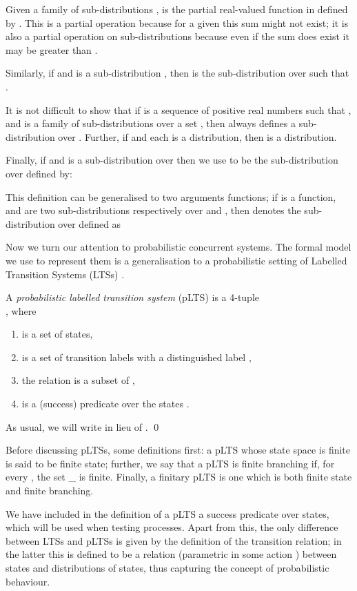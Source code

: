 \documentclass{LMCS}
\begin{document}
Given a family of sub-distributions ,
  is the partial 
real-valued function in  defined by
.
This is a partial operation because for a given  this sum  might not exist;
it is also a partial operation on sub-distributions because even if the sum does exist
it may be greater than .

Similarly, if  and  is a sub-distribution , then  is 
the sub-distribution over  such that .

It is not difficult to show that if  is a sequence 
of positive real numbers such that , 
and  is a family of sub-distributions 
over a set , then  
always defines a sub-distribution over .
Further, if  and each  is a distribution, then 
 is a distribution.

Finally, if  and  is a sub-distribution
over  then we use  to be the sub-distribution over 
defined by:

This definition can be generalised to two arguments functions; if  
 is a function, 
and  are two sub-distributions respectively 
over  and , then  denotes 
the sub-distribution over  defined as
\vspace{2 pt}

\noindent Now we turn our attention to probabilistic concurrent systems. The
formal model we  use to represent them is a 
generalisation to a probabilistic setting of 
Labelled Transition Systems (LTSs) \cite{milner}.
\begin{defi}\rm
A \emph{probabilistic labelled transition system} (pLTS) is a 4-tuple\\
, where
\begin{enumerate}[label=(\roman*)] \item  is a set of states,
\item  is a set of transition labels with a distinguished label ,
\item the relation  is a subset of ,
\item  is a (success) predicate over the states . 
\end{enumerate}
As usual, we will write  in lieu of .
\qed
\end{defi}\enlargethispage{9 pt}
Before discussing pLTSs, some definitions first: a pLTS whose state space is finite is said to 
be finite state; further, we say that a pLTS  
is finite branching if, for every , the set 
 \mu \in \Act_\tau 
 is finite.
 Finally, a finitary pLTS is one which is both finite 
state and finite branching.

We have included in the definition of a pLTS a success predicate  over states, which will
be used when testing processes. Apart from this, the 
only difference between LTSs and pLTSs is given by the definition of the transition relation; 
in the latter this is defined to be a relation (parametric in some action ) between states 
and distributions of states, thus capturing the concept of probabilistic behaviour. 
\end{document}
